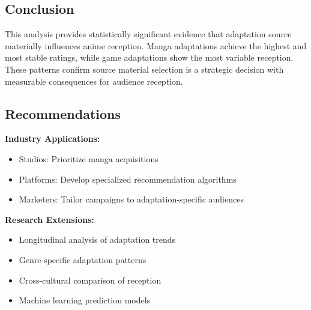 \documentclass{article}
\begin{document}
\subsection{Conclusion}
This analysis provides statistically significant evidence that adaptation source materially influences anime reception. Manga adaptations achieve the highest and most stable ratings, while game adaptations show the most variable reception. These patterns confirm source material selection is a strategic decision with measurable consequences for audience reception.

\subsection{Recommendations}
\textbf{Industry Applications:}
\begin{itemize}
    \item Studios: Prioritize manga acquisitions
    \item Platforms: Develop specialized recommendation algorithms
    \item Marketers: Tailor campaigns to adaptation-specific audiences
\end{itemize}

\textbf{Research Extensions:}
\begin{itemize}
    \item Longitudinal analysis of adaptation trends
    \item Genre-specific adaptation patterns
    \item Cross-cultural comparison of reception
    \item Machine learning prediction models
\end{itemize}
\end{document}

